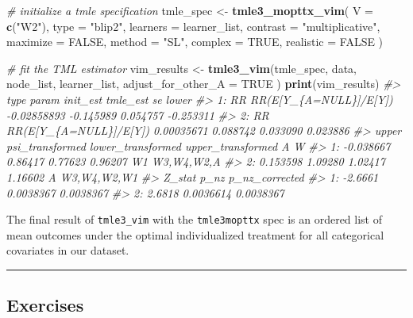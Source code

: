 \documentclass[12pt, krantz2,]{krantz}
\newenvironment{Shaded}{\begin{snugshade}}{\end{snugshade}}
\newcommand{\CommentTok}[1]{\textcolor[rgb]{0.37,0.37,0.37}{\textit{#1}}}
\newcommand{\DataTypeTok}[1]{\textcolor[rgb]{0.27,0.27,0.27}{#1}}
\newcommand{\KeywordTok}[1]{\textcolor[rgb]{0.27,0.27,0.27}{\textbf{#1}}}
\newcommand{\NormalTok}[1]{#1}
\newcommand{\OtherTok}[1]{\textcolor[rgb]{0.37,0.37,0.37}{#1}}
\newcommand{\StringTok}[1]{\textcolor[rgb]{0.5,0.5,0.5}{#1}}
\theoremstyle{definition}
\theoremstyle{definition}
\theoremstyle{definition}
\newcommand{\1}{\mathbbm{1}}
\begin{document}
\begin{Shaded}
\begin{Highlighting}[]
\CommentTok{# initialize a tmle specification}
\NormalTok{tmle_spec <-}\StringTok{ }\KeywordTok{tmle3_mopttx_vim}\NormalTok{(}
  \DataTypeTok{V =} \KeywordTok{c}\NormalTok{(}\StringTok{"W2"}\NormalTok{),}
  \DataTypeTok{type =} \StringTok{"blip2"}\NormalTok{,}
  \DataTypeTok{learners =}\NormalTok{ learner_list,}
  \DataTypeTok{contrast =} \StringTok{"multiplicative"}\NormalTok{,}
  \DataTypeTok{maximize =} \OtherTok{FALSE}\NormalTok{,}
  \DataTypeTok{method =} \StringTok{"SL"}\NormalTok{,}
  \DataTypeTok{complex =} \OtherTok{TRUE}\NormalTok{,}
  \DataTypeTok{realistic =} \OtherTok{FALSE}
\NormalTok{)}
\end{Highlighting}
\end{Shaded}

\begin{Shaded}
\begin{Highlighting}[]
\CommentTok{# fit the TML estimator}
\NormalTok{vim_results <-}\StringTok{ }\KeywordTok{tmle3_vim}\NormalTok{(tmle_spec, data, node_list, learner_list,}
  \DataTypeTok{adjust_for_other_A =} \OtherTok{TRUE}
\NormalTok{)}
\KeywordTok{print}\NormalTok{(vim_results)}
\CommentTok{#>    type                  param    init_est  tmle_est       se     lower}
\CommentTok{#> 1:   RR RR(E[Y_\{A=NULL\}]/E[Y]) -0.02858893 -0.145989 0.054757 -0.253311}
\CommentTok{#> 2:   RR RR(E[Y_\{A=NULL\}]/E[Y])  0.00035671  0.088742 0.033090  0.023886}
\CommentTok{#>        upper psi_transformed lower_transformed upper_transformed  A           W}
\CommentTok{#> 1: -0.038667         0.86417           0.77623           0.96207 W1  W3,W4,W2,A}
\CommentTok{#> 2:  0.153598         1.09280           1.02417           1.16602  A W3,W4,W2,W1}
\CommentTok{#>     Z_stat      p_nz p_nz_corrected}
\CommentTok{#> 1: -2.6661 0.0038367      0.0038367}
\CommentTok{#> 2:  2.6818 0.0036614      0.0038367}
\end{Highlighting}
\end{Shaded}

The final result of \texttt{tmle3\_vim} with the \texttt{tmle3mopttx} spec is an ordered list
of mean outcomes under the optimal individualized treatment for all categorical
covariates in our dataset.

\begin{center}\rule{0.5\linewidth}{0.5pt}\end{center}

\hypertarget{exercises-2}{%
\subsection{Exercises}\label{exercises-2}}
\end{document}
